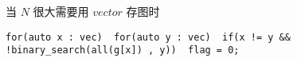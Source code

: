 \documentclass[E:/GsjzTle/main/main.tex]{subfiles}
\begin{document}
当 \(N\) 很大需要用 \(vector\) 存图时

\begin{lstlisting}
for(auto x : vec)  for(auto y : vec)  if(x != y && !binary_search(all(g[x]) , y))  flag = 0;
\end{lstlisting}
\end{document}
